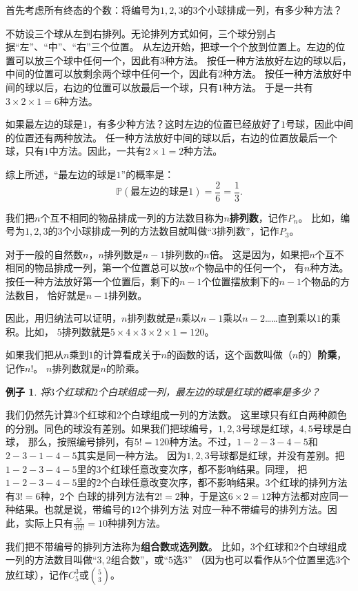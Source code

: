 \documentclass[12pt,UTF8]{ctexbook}
\newtheorem{ex}{例子}[section]
\begin{document}
首先考虑所有终态的个数：将编号为$1,2,3$的$3$个小球排成一列，有多少种方法？

不妨设三个球从左到右排列。无论排列方式如何，三个球分别占据“左”、“中”、“右”三个位置。
从左边开始，把球一个个放到位置上。左边的位置可以放三个球中任何一个，因此有$3$种方法。
按任一种方法放好左边的球以后，中间的位置可以放剩余两个球中任何一个，因此有$2$种方法。
按任一种方法放好中间的球以后，右边的位置可以放最后一个球，只有$1$种方法。
于是一共有$3\times 2\times 1 = 6$种方法。

如果最左边的球是$1$，有多少种方法？这时左边的位置已经放好了$1$号球，因此中间的位置还有两种放法。
任一种方法放好中间的球以后，右边的位置放最后一个球，只有$1$中方法。因此，一共有$2\times 1 = 2$种方法。

综上所述，“最左边的球是$1$”的概率是：
$$ \mathbb{P}(\mbox{最左边的球是}1) = \frac{2}{6} = \frac{1}{3}. $$

我们把$n$个互不相同的物品排成一列的方法数目称为$n$\textbf{排列数}，记作$P_n$。
比如，编号为$1,2,3$的$3$个小球排成一列的方法数目就叫做“$3$排列数”，记作$P_3$。

对于一般的自然数$n$，$n$排列数是$n-1$排列数的$n$倍。
这是因为，如果把$n$个互不相同的物品排成一列，第一个位置总可以放$n$个物品中的任何一个，
有$n$种方法。按任一种方法放好第一个位置后，剩下的$n-1$个位置摆放剩下的$n-1$个物品的方法数目，
恰好就是$n-1$排列数。

因此，用归纳法可以证明，$n$排列数就是$n$乘以$n-1$乘以$n-2$……直到乘以$1$的乘积。比如，
$5$排列数就是$5\times 4\times 3\times 2\times 1 = 120$。

如果我们把从$n$乘到$1$的计算看成关于$n$的函数的话，这个函数叫做（$n$的）\textbf{阶乘}，记作$n!$。
$n$排列数就是$n$的阶乘。

\begin{ex}
    将$3$个红球和$2$个白球组成一列，最左边的球是红球的概率是多少？
\end{ex}
我们仍然先计算$3$个红球和$2$个白球组成一列的方法数。
这里球只有红白两种颜色的分别。同色的球没有差别。如果我们把球编号，$1,2,3$号球是红球，$4,5$号球是白球，
那么，按照编号排列，有$5! = 120$种方法。不过，$1-2-3-4-5$和$2-3-1-4-5$其实是同一种方法。
因为$1,2,3$号球都是红球，并没有差别。把$1-2-3-4-5$里的$3$个红球任意改变次序，都不影响结果。同理，
把$1-2-3-4-5$里的$2$个白球任意改变次序，都不影响结果。$3$个红球的排列方法有$3! = 6$种，$2$个
白球的排列方法有$2! = 2$种，于是这$6\times 2 = 12$种方法都对应同一种结果。也就是说，带编号的$12$个排列方法
对应一种不带编号的排列方法。因此，实际上只有$\frac{5!}{3!2!} = 10$种排列方法。

我们把不带编号的排列方法称为\textbf{组合数}或\textbf{选列数}。
比如，$3$个红球和$2$个白球组成一列的方法数目叫做“$3,2$组合数”，或“$5$选$3$”
（因为也可以看作从$5$个位置里选$3$个放红球），记作$C_5^3$或$5 \choose 3$。
\end{document}
